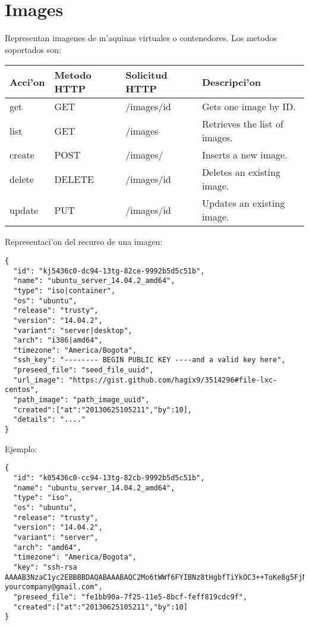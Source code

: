\section{Images}
Representan imagenes de m'aquinas virtuales o contenedores. Los metodos soportados son:

\begin{center}
 \begin{tabular}{| l | l | l | l |}
 \hline
  \rowcolor{blueapi}
  \textbf{Acci'on} & \textbf{Metodo HTTP} & \textbf{Solicitud HTTP} & \textbf{Descripci'on} \\ [0.5ex] 
  \hline\hline
  get & GET & /images/id & Gets one image by ID. \\
  \hline
  list & GET & /images & Retrieves the list of images. \\
  \hline  
  create & POST & /images/ & Inserts a new image. \\
  \hline
  delete & DELETE & /images/id & Deletes an existing image. \\
  \hline  
  update & PUT & /images/id & Updates an existing image. \\ [1ex] 
  \hline
\end{tabular}
\end{center}

\vspace{1cm}
Representaci'on del recurso de una imagen:
\vspace{1cm}

\begin{lstlisting}[style=json]
{
  "id": "kj5436c0-dc94-13tg-82ce-9992b5d5c51b",
  "name": "ubuntu_server_14.04.2_amd64",
  "type": "iso|container",
  "os": "ubuntu", 
  "release": "trusty",
  "version": "14.04.2", 
  "variant": "server|desktop", 
  "arch": "i386|amd64", 
  "timezone": "America/Bogota", 
  "ssh_key": "-------- BEGIN PUBLIC KEY ----and a valid key here",
  "preseed_file": "seed_file_uuid",
  "url_image": "https://gist.github.com/hagix9/3514296#file-lxc-centos",
  "path_image": "path_image_uuid",  
  "created":["at":"20130625105211","by":10],
  "details": "...."
}
\end{lstlisting}

Ejemplo:

\medskip
\begin{lstlisting}[style=json]
{
  "id": "k05436c0-cc94-13tg-82cb-9992b5d5c51b",
  "name": "ubuntu_server_14.04.2_amd64",
  "type": "iso",
  "os": "ubuntu", 
  "release": "trusty",
  "version": "14.04.2", 
  "variant": "server", 
  "arch": "amd64", 
  "timezone": "America/Bogota", 
  "key": "ssh-rsa AAAAB3NzaC1yc2EBBBBDAQABAAABAQC2Mo6tWWf6FYIBNz8tHgbfTiYkOC3++ToKe8g5FjNW9Uw86CeqmP4PiTZiQwdDCDqikk9xETEEhVnjDEJO4mx8W/q77Ciq1wGnraqI9FfNfH6LRfGnZ+rHxr371pbcqHXFY11WatdyjvmPiyDmMWTJzoDUXANIQ5YE9Lpb23PwtUQ3FzyBtImGA+i474Vf/Opz68kSzEElm+oaNmLNcHp0AyomA6i5xTTxYyP2+BEJtVT0CSXM5YVbs8iXVlD/3XdukT9J0oFzdxKkI5lBvhnhjE91XnfllNuE9gAoZGiX3Cya384ofNGwe8ARu9Wi29a4zoRcMpV8AD0TLYRHeJJJ yourcompany@gmail.com",
  "preseed_file": "fe1bb90a-7f25-11e5-8bcf-feff819cdc9f",
  "created":["at":"20130625105211","by":10]
}
\end{lstlisting}

